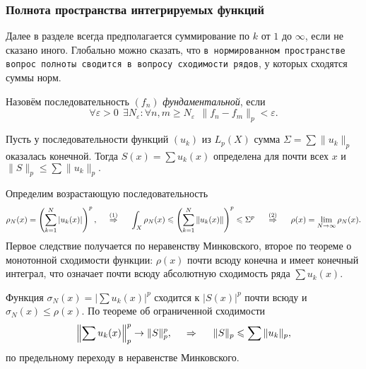 
\subsubsection*{Полнота пространства интегрируемых функций}

Далее в разделе всегда предполагается суммирование по $k$ от $1$ до $\infty$, если не сказано иного. Глобально можно сказать, что \texttt{в нормированном пространстве вопрос полноты сводится в вопросу сходимости рядов}, у которых сходятся суммы норм. 

\begin{to_def}
    Назовём последовательность $(f_n)$ \textit{фундаментальной}, если
    \begin{equation*}
        \forall \varepsilon > 0 \ \ 
        \exists N_\varepsilon \colon 
        \forall n, m \geq N_\varepsilon \ \ 
        \|f_n - f_m\|_p < \varepsilon.
    \end{equation*}
\end{to_def}

\begin{to_lem}
    Пусть у последовательности функций $(u_k)$ из $L_p (X)$ сумма
    $\Sigma = \sum \|u_k\|_p$
    оказалась конечной. Тогда $S(x) = \sum u_k (x)$ определена для почти всех $x$ и
    $\|S\|_p \leq \sum \|u_k\|_p.$
\end{to_lem}

\begin{uproof}
    Определим возрастающую последовательность
    \begin{equation*}
        \rho_N (x) = \left(
            \sum_{k=1}^{N} |u_k (x)|
        \right)^p,
        \hspace{0.5cm} \overset{(1)}{\Rightarrow} \hspace{0.5cm}
        \int_X \rho_N (x) \leq \left(
            \sum_{k=1}^{N} \|u_k (x)\|
        \right)^p  \leq \Sigma^p
        \hspace{0.5cm} \overset{(2)}{\Rightarrow} \hspace{0.5cm}
        \rho(x) = \lim_{N \to \infty} \rho_N (x).
    \end{equation*}
    Первое следствие получается по неравенству Минковского, второе по теореме о монотонной сходимости функции: $\rho(x)$ почти всюду конечна и имеет конечный интеграл, что означает почти всюду абсолютную сходимость ряда $\sum u_k (x)$. 

    Функция $\sigma_N (x) = \big| \sum u_k (x)\big|^p$ сходится к $|S(x)|^p$ почти всюду и $\sigma_N (x) \leq \rho(x)$. По теореме об ограниченной сходимости
    \begin{equation*}
        \left\|\sum u_k(x)\right\|_p^p \to \|S\|_p^p,
        \hspace{0.5cm} \Rightarrow \hspace{0.5cm}
        \|S\|_p \leq \sum \|u_k\|_p,
    \end{equation*}
    по предельному переходу в неравенстве Минковского. 
\end{uproof}

